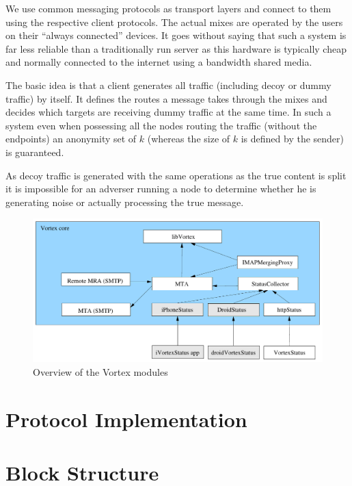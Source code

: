 We use common messaging protocols as transport layers and connect to them using the respective client protocols. The actual mixes are operated by the users on their ``always connected'' devices. It goes without saying that such a system is far less reliable than a traditionally run server as this hardware is typically cheap and normally connected to the internet using a bandwidth shared media.

The basic idea is that a client generates all traffic (including decoy or dummy traffic) by itself. It defines the routes a message takes through the mixes and decides which targets are receiving dummy traffic at the same time. In such a system even when possessing all the nodes routing the traffic (without the endpoints) an anonymity set of $k$ (whereas the size of $k$ is defined by the sender) is guaranteed.

As decoy traffic is generated with the same operations as the true content is split it is impossible for an adverser running a node to determine whether he is generating noise or actually processing the true message.

\begin{figure}[h]
	\includegraphics[width=\columnwidth]{inc/VortexModules.pdf}
	\caption{Overview of the Vortex modules}
	\label{fig:vortexModules}
\end{figure}

\section{Protocol Implementation\label{protoImpl}}

\section{Block Structure}
 

